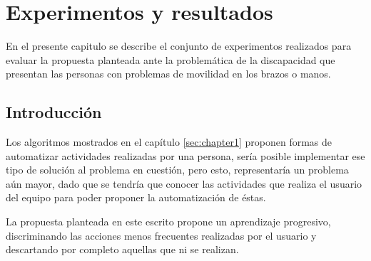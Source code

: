 \chapter{Experimentos y resultados}
\label{sec:chapter5}

En el presente capitulo se describe el conjunto de experimentos realizados
 para evaluar la propuesta planteada ante la problem\'atica de la discapacidad 
 que presentan las personas con problemas de movilidad en los brazos o manos.


\section{Introducci\'on}

Los algoritmos mostrados en el cap\'itulo \ref{sec:chapter1} proponen formas
 de automatizar actividades realizadas por una persona, ser\'ia posible 
 implementar ese tipo de soluci\'on al problema en cuesti\'on, pero esto, 
 representar\'ia un problema a\'un mayor, dado que se tendr\'ia que conocer 
 las actividades que realiza el usuario del equipo para poder proponer la 
 automatizaci\'on de \'estas. 


La propuesta planteada en este escrito propone un aprendizaje progresivo,
 discriminando las acciones menos frecuentes realizadas por el usuario y 
 descartando por completo aquellas que ni se realizan. 




